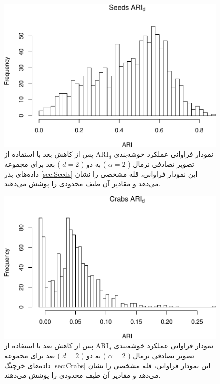\begin{figure}[H]
\centering
\includegraphics[width=0.7\linewidth]{Report_files/figure-latex/unnamed-chunk-3-5}
\caption{
نمودار فراوانی عملکرد خوشه‌بندی 
$\mathrm{ARI}_d$
پس از کاهش بعد با استفاده از تصویر تصادفی
نرمال (%
$\alpha=2$%
)
به دو (%
$d=2$%
)
بعد برای مجموعه داده‌های
بذر
\ref{sec:Seeds}
این نمودار فراوانی،
قله
مشخصی را نشان 
می‌دهد
و مقادیر آن طیف 
محدودی
را پوشش می‌دهند.
}
\end{figure}

\begin{figure}[H]
\centering
\includegraphics[width=0.7\linewidth]{Report_files/figure-latex/unnamed-chunk-3-6}
\caption{
نمودار فراوانی عملکرد خوشه‌بندی 
$\mathrm{ARI}_d$
پس از کاهش بعد با استفاده از تصویر تصادفی
نرمال (%
$\alpha=2$%
)
به دو (%
$d=2$%
)
بعد برای مجموعه داده‌های
خرچنگ
\ref{sec:Crabs}
این نمودار فراوانی،
قله
مشخصی را نشان 
می‌دهد
و مقادیر آن طیف 
محدودی
را پوشش می‌دهند.
}
\end{figure}

